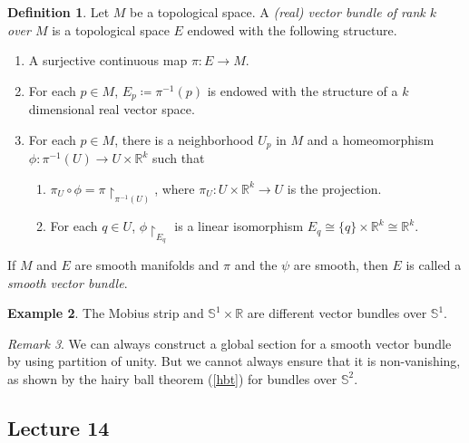 \documentclass[10pt,letterpaper,cm]{nupset}
\theoremstyle{definition}
\newtheorem{definition}{Definition}[subsection]
\newtheorem{exmp}[definition]{Example}
\theoremstyle{theorem}
\theoremstyle{remark}
\newtheorem{remark}[definition]{Remark}
\newcommand{\R}{\mathbb R}
\renewcommand{\S}{\mathbb S}
\newcommand{\1}{\mathbf{1}}
\newcommand{\0}{\vec 0}
\begin{document}
\begin{definition}
Let $M$ be a topological space. A \textit{(real) vector bundle of rank $k$ over $M$} is a topological space $E$ endowed with the following structure.
\begin{enumerate}
\item A surjective continuous map $\pi : E \to M$.
\item For each $p \in M$, $E_p\coloneqq  \pi^{-1}(p)$ is endowed with the structure of a $k$ dimensional real vector space.
\item For each $p\in M$, there is a neighborhood $U_p$ in $M$ and a homeomorphism $\phi :\pi^{-1}(U) \to U \times \R^k$ such that
\begin{enumerate}
\item $\pi_U \circ \phi  = \pi \restriction_{\pi^{-1}(U)}$, where $\pi_U : U \times \R^k \to U$ is the projection.
\item For each $q\in U$, $\phi \restriction_{E_q}$ is a linear isomorphism $E_q \cong \{q\} \times \R^k \cong \R^k.$
\end{enumerate}
\end{enumerate}
If $M$ and $E$ are smooth manifolds and $\pi$ and the $\psi$ are smooth, then $E$ is called a \textit{smooth vector bundle}.
\end{definition}

\begin{exmp}
The Mobius strip and $\S^1 \times \R$ are different vector bundles over $\S^1$.
\end{exmp}

\begin{remark}
We can always construct a global section for a smooth vector bundle by using partition of unity. But we cannot always ensure that it is non-vanishing, as shown by the hairy ball theorem (\cref{hbt}) for bundles over $\S^2$.
\end{remark}

\subsection{Lecture 14}
\end{document}
